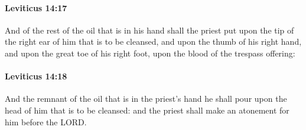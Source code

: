 		\paragraph{Leviticus 14:17} %
			\label{LEVITICUS-14-17}

			And of the rest of the oil that is in his hand shall the priest put upon the tip of the right ear of him that is to be cleansed, and upon the thumb of his right hand, and upon the great toe of his right foot, upon the blood of the trespass offering:


		\paragraph{Leviticus 14:18} %
			\label{LEVITICUS-14-18}

			And the remnant of the oil that is in the priest’s hand he shall pour upon the head of him that is to be cleansed: and the priest shall make an atonement for him before the LORD.

